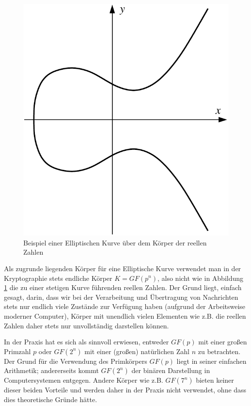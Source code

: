 \begin{refsegment}
\begin{figure}[ht]
\begin{center}
\includegraphics[scale=0.60]{figures/elliptic-curve}
\caption{Beispiel einer Elliptischen Kurve über dem Körper der reellen Zahlen}
\label{ExampleEllipticCurve}
\end{center}
\end{figure}
Als zugrunde liegenden Körper für eine Elliptische Kurve verwendet man in der Kryptographie stets endliche Körper $K=GF(p^n)$, also nicht wie in Abbildung \ref{ExampleEllipticCurve} die zu einer stetigen Kurve führenden reellen Zahlen. Der Grund liegt, einfach gesagt, darin, dass wir bei der Verarbeitung und Übertragung von Nachrichten stets nur endlich viele Zustände zur Verfügung haben (aufgrund der Arbeitsweise moderner Computer), Körper mit unendlich vielen Elementen wie z.B. die reellen Zahlen daher stets nur unvollständig darstellen können.

In der Praxis hat es sich als sinnvoll erwiesen, entweder $GF(p)$ mit einer großen Primzahl $p$ oder $GF(2^n)$ mit einer (großen) natürlichen Zahl $n$ zu betrachten. Der Grund für die Verwendung des Primkörpers $GF(p)$ liegt in seiner einfachen Arithmetik; andererseits kommt $GF(2^n)$ der binären Darstellung in Computersystemen entgegen. Andere Körper wie z.B. $GF(7^n)$ bieten keiner dieser beiden Vorteile und werden daher in der Praxis nicht verwendet, ohne dass dies theoretische Gründe hätte.


\end{refsegment}
